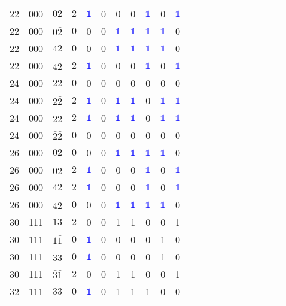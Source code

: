 \begin{longtable*}{c| cccccccccccccccccccc }
22& 000& $02$& $2$& \textcolor{blue}{$\mathds{1}$}& 0& 0& 0& \textcolor{blue}{$\mathds{1}$}& 0& \textcolor{blue}{$\mathds{1}$}\\
22& 000& $0\bar{2}$& $0$& 0& 0& \textcolor{blue}{$\mathds{1}$}& \textcolor{blue}{$\mathds{1}$}& \textcolor{blue}{$\mathds{1}$}& \textcolor{blue}{$\mathds{1}$}& 0\\
22& 000& $42$& $0$& 0& 0& \textcolor{blue}{$\mathds{1}$}& \textcolor{blue}{$\mathds{1}$}& \textcolor{blue}{$\mathds{1}$}& \textcolor{blue}{$\mathds{1}$}& 0\\
22& 000& $4\bar{2}$& $2$& \textcolor{blue}{$\mathds{1}$}& 0& 0& 0& \textcolor{blue}{$\mathds{1}$}& 0& \textcolor{blue}{$\mathds{1}$}\\
24& 000& $22$& $0$& 0& 0& 0& 0& 0& 0& 0\\
24& 000& $2\bar{2}$& $2$& \textcolor{blue}{$\mathds{1}$}& 0& \textcolor{blue}{$\mathds{1}$}& \textcolor{blue}{$\mathds{1}$}& 0& \textcolor{blue}{$\mathds{1}$}& \textcolor{blue}{$\mathds{1}$}\\
24& 000& $\bar{2}2$& $2$& \textcolor{blue}{$\mathds{1}$}& 0& \textcolor{blue}{$\mathds{1}$}& \textcolor{blue}{$\mathds{1}$}& 0& \textcolor{blue}{$\mathds{1}$}& \textcolor{blue}{$\mathds{1}$}\\
24& 000& $\bar{2}\bar{2}$& $0$& 0& 0& 0& 0& 0& 0& 0\\
26& 000& $02$& $0$& 0& 0& \textcolor{blue}{$\mathds{1}$}& \textcolor{blue}{$\mathds{1}$}& \textcolor{blue}{$\mathds{1}$}& \textcolor{blue}{$\mathds{1}$}& 0\\
26& 000& $0\bar{2}$& $2$& \textcolor{blue}{$\mathds{1}$}& 0& 0& 0& \textcolor{blue}{$\mathds{1}$}& 0& \textcolor{blue}{$\mathds{1}$}\\
26& 000& $42$& $2$& \textcolor{blue}{$\mathds{1}$}& 0& 0& 0& \textcolor{blue}{$\mathds{1}$}& 0& \textcolor{blue}{$\mathds{1}$}\\
26& 000& $4\bar{2}$& $0$& 0& 0& \textcolor{blue}{$\mathds{1}$}& \textcolor{blue}{$\mathds{1}$}& \textcolor{blue}{$\mathds{1}$}& \textcolor{blue}{$\mathds{1}$}& 0\\
30& 111& $13$& $2$& 0& 0& 1& 1& 0& 0& 1\\
30& 111& $1\bar{1}$& $0$& \textcolor{blue}{$\mathds{1}$}& 0& 0& 0& 0& 1& 0\\
30& 111& $\bar{3}3$& $0$& \textcolor{blue}{$\mathds{1}$}& 0& 0& 0& 0& 1& 0\\
30& 111& $\bar{3}\bar{1}$& $2$& 0& 0& 1& 1& 0& 0& 1\\
32& 111& $33$& $0$& \textcolor{blue}{$\mathds{1}$}& 0& 1& 1& 1& 0& 0\\

\end{longtable*}
